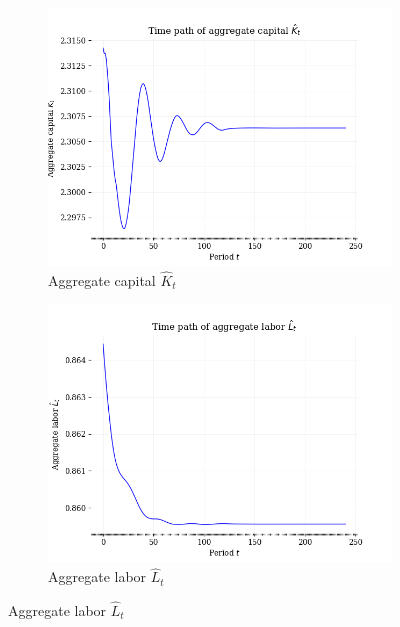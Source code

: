 \documentclass[letterpaper,12pt]{article}
\theoremstyle{definition}
\begin{document}
    \begin{figure}[htbp]\centering \captionsetup{width=5.0in}
    \caption{\label{FigTP_KLY}\textbf{Equilibrium transition paths of aggregate capital, labor, and output}}
      \begin{subfigure}[b]{0.4\textwidth}
        \includegraphics[width=\textwidth]{images/TP_K_path.png}
        \caption{Aggregate capital $\hat{K}_t$}
        \label{FigTP_KLY_K}
      \end{subfigure}
      \begin{subfigure}[b]{0.4\textwidth}
        \includegraphics[width=\textwidth]{images/TP_L_path.png}
        \caption{Aggregate labor $\hat{L}_t$}
        \label{FigTP_KLY_L}
      \end{subfigure}

\end{figure}
\end{document}
